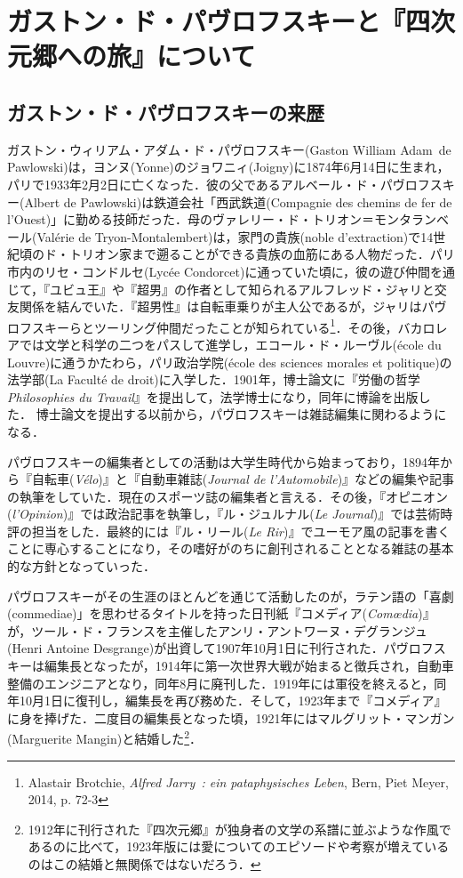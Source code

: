 \chapter{ガストン・ド・パヴロフスキーと『四次元郷への旅』について}
\section{ガストン・ド・パヴロフスキーの来歴}
ガストン・ウィリアム・アダム・ド・パヴロフスキー(Gaston William Adam de Pawlowski)は，ヨンヌ(Yonne)のジョワニィ(Joigny)に1874年6月14日に生まれ，パリで1933年2月2日に亡くなった．彼の父であるアルベール・ド・パヴロフスキー(Albert de Pawlowski)は鉄道会社「西武鉄道(Compagnie des chemins de fer de l'Ouest)」に勤める技師だった．母のヴァレリー・ド・トリオン＝モンタランベール(Valérie de Tryon-Montalembert)は，家門の貴族(noble d'extraction)で14世紀頃のド・トリオン家まで遡ることができる貴族の血筋にある人物だった．パリ市内のリセ・コンドルセ(Lycée Condorcet)に通っていた頃に，彼の遊び仲間を通じて，『ユビュ王』や『超男』の作者として知られるアルフレッド・ジャリと交友関係を結んでいた．『超男性』は自転車乗りが主人公であるが，ジャリはパヴロフスキーらとツーリング仲間だったことが知られている\footnote{Alastair Brotchie, \emph{Alfred Jarry~: ein pataphysisches Leben}, Bern, Piet Meyer, 2014, p. 72-3}．その後，バカロレアでは文学と科学の二つをパスして進学し，エコール・ド・ルーヴル(école du Louvre)に通うかたわら，パリ政治学院(école des sciences morales et politique)の法学部(La Faculté de droit)に入学した．1901年，博士論文に『労働の哲学\emph{Philosophies du Travail}』を提出して，法学博士になり，同年に博論を出版した． 博士論文を提出する以前から，パヴロフスキーは雑誌編集に関わるようになる．

パヴロフスキーの編集者としての活動は大学生時代から始まっており，1894年から『自転車(\emph{Vélo})』と『自動車雑誌(\emph{Journal de l’Automobile})』などの編集や記事の執筆をしていた．現在のスポーツ誌の編集者と言える．その後，『オピニオン(\emph{l’Opinion})』では政治記事を執筆し，『ル・ジュルナル(\emph{Le Journal})』では芸術時評の担当をした．最終的には『ル・リール(\emph{Le Rir})』でユーモア風の記事を書くことに専心することになり，その嗜好がのちに創刊されることとなる雑誌の基本的な方針となっていった．

パヴロフスキーがその生涯のほとんどを通じて活動したのが，ラテン語の「喜劇(commediae)」を思わせるタイトルを持った日刊紙『コメディア(\emph{Comœdia})』が，ツール・ド・フランスを主催したアンリ・アントワーヌ・デグランジュ(Henri Antoine Desgrange)が出資して1907年10月1日に刊行された．パヴロフスキーは編集長となったが，1914年に第一次世界大戦が始まると徴兵され，自動車整備のエンジニアとなり，同年8月に廃刊した．1919年には軍役を終えると，同年10月1日に復刊し，編集長を再び務めた．そして，1923年まで『コメディア』に身を捧げた．二度目の編集長となった頃，1921年にはマルグリット・マンガン(Marguerite Mangin)と結婚した\footnote{1912年に刊行された『四次元郷』が独身者の文学の系譜に並ぶような作風であるのに比べて，1923年版には愛についてのエピソードや考察が増えているのはこの結婚と無関係ではないだろう．}．

